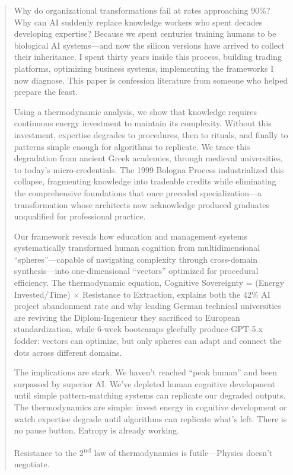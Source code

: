 \begin{abstract}
Why do organizational transformations fail at rates approaching 90\%? Why can AI suddenly replace knowledge workers who spent decades developing expertise? Because we spent centuries training humans to be biological AI systems—and now the silicon versions have arrived to collect their inheritance. I spent thirty years inside this process, building trading platforms, optimizing business systems, implementing the frameworks I now diagnose. This paper is confession literature from someone who helped prepare the feast.

Using a thermodynamic analysis, we show that knowledge requires continuous energy investment to maintain its complexity. Without this investment, expertise degrades to procedures, then to rituals, and finally to patterns simple enough for algorithms to replicate. We trace this degradation from ancient Greek academies, through medieval universities, to today's micro-credentials. The 1999 Bologna Process industrialized this collapse, fragmenting knowledge into tradeable credits while eliminating the comprehensive foundations that once preceded specialization---a transformation whose architects now acknowledge produced graduates unqualified for professional practice.

Our framework reveals how education and management systems systematically transformed human cognition from multidimensional ``spheres''---capable of navigating complexity through cross-domain synthesis---into one-dimensional ``vectors'' optimized for procedural efficiency. The thermodynamic equation, Cognitive Sovereignty = (Energy Invested/Time) $\times$ Resistance to Extraction, explains both the 42\% AI project abandonment rate and why leading German technical universities are reviving the Diplom-Ingenieur they sacrificed to European standardization, while 6-week bootcamps gleefully produce GPT-5.x fodder: vectors can optimize, but only spheres can adapt and connect the dots across different domains.

The implications are stark. We haven't reached ``peak human'' and been surpassed by superior AI. We've depleted human cognitive development until simple pattern-matching systems can replicate our degraded outputs. The thermodynamics are simple: invest energy in cognitive development or watch expertise degrade until algorithms can replicate what's left. There is no pause button. Entropy is already working.

Resistance to the 2\textsuperscript{nd} law of thermodynamics is futile---Physics doesn't negotiate.
\end{abstract}